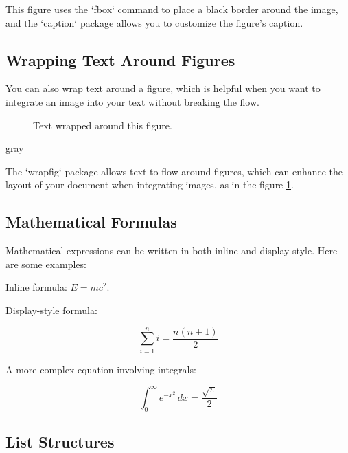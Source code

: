 This figure uses the `fbox` command to place a black border around the image, and the `caption` package allows you to customize the figure's caption.


\subsection{Wrapping Text Around Figures}

You can also wrap text around a figure, which is helpful when you want to integrate an image into your text without breaking the flow.

\begin{figure}
    \centering
    \caption{Text wrapped around this figure.}
    \label{fig::wrap_figure}
\end{figure}

\begin{color}{gray}
  \lipsum[4-6]
\end{color}

The `wrapfig` package allows text to flow around figures, which can enhance the layout of your document when integrating images, as in the figure \ref{fig::wrap_figure}.

\subsection{Mathematical Formulas}

Mathematical expressions can be written in both inline and display style. Here are some examples:

Inline formula: $E = mc^2$.

Display-style formula:

\[
\sum_{i=1}^n i = \frac{n(n+1)}{2}
\]

A more complex equation involving integrals:

\[
\int_{0}^{\infty} e^{-x^2} \, dx = \frac{\sqrt{\pi}}{2}
\]

\subsection{List Structures}

